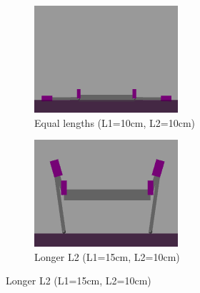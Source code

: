 \begin{figure}[h]
    \centering
    \begin{subfigure}[b]{0.32\textwidth}
        \centering
        \includegraphics[width=\textwidth]{Images/link_length_optimization/equal_len_pose.png}
        \caption{Equal lengths (L1=10cm, L2=10cm)}
        \label{fig:link_length_optimization:equal_len_pose}
    \end{subfigure}
    \hfill
    \begin{subfigure}[b]{0.32\textwidth}
        \centering
        \includegraphics[width=\textwidth]{Images/link_length_optimization/longer_L2_pose.png}
        \caption{Longer L2 (L1=15cm, L2=10cm)}
        \label{fig:link_length_optimization:longer_L2_pose}

\end{subfigure}
\end{figure}
